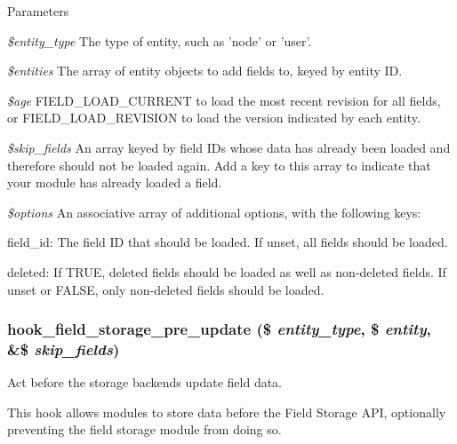 \begin{DoxyParams}{Parameters}
\item[{\em \$entity\_\-type}]The type of entity, such as 'node' or 'user'. \item[{\em \$entities}]The array of entity objects to add fields to, keyed by entity ID. \item[{\em \$age}]FIELD\_\-LOAD\_\-CURRENT to load the most recent revision for all fields, or FIELD\_\-LOAD\_\-REVISION to load the version indicated by each entity. \item[{\em \$skip\_\-fields}]An array keyed by field IDs whose data has already been loaded and therefore should not be loaded again. Add a key to this array to indicate that your module has already loaded a field. \item[{\em \$options}]An associative array of additional options, with the following keys:
\begin{DoxyItemize}
\item field\_\-id: The field ID that should be loaded. If unset, all fields should be loaded.
\item deleted: If TRUE, deleted fields should be loaded as well as non-\/deleted fields. If unset or FALSE, only non-\/deleted fields should be loaded. 
\end{DoxyItemize}\end{DoxyParams}
\hypertarget{group__field__storage_ga3cc35769d019ea0dcfedc7ca6b084983}{
\subsubsection[{hook\_\-field\_\-storage\_\-pre\_\-update}]{\setlength{\rightskip}{0pt plus 5cm}hook\_\-field\_\-storage\_\-pre\_\-update (\$ {\em entity\_\-type}, \/  \$ {\em entity}, \/  \&\$ {\em skip\_\-fields})}}
\label{group__field__storage_ga3cc35769d019ea0dcfedc7ca6b084983}
Act before the storage backends update field data.

This hook allows modules to store data before the Field Storage API, optionally preventing the field storage module from doing so.


